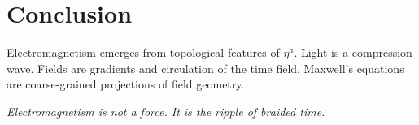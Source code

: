 \documentclass[12pt]{article}
\begin{document}
\section*{Conclusion}

Electromagnetism emerges from topological features of $\eta^a$. Light is a compression wave. Fields are gradients and circulation of the time field. Maxwell's equations are coarse-grained projections of field geometry.

\begin{center}
\textit{Electromagnetism is not a force. It is the ripple of braided time.}
\end{center}
\end{document}
